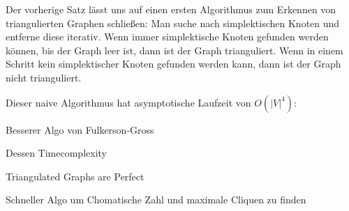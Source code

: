 \documentclass[../main.tex]{subfiles}
\begin{document}
Der vorherige Satz lässt uns auf einen ersten Algorithmus zum Erkennen von triangulierten Graphen schließen: Man suche nach simplektischen Knoten und entferne diese iterativ. Wenn immer simplektische Knoten gefunden werden können, bis der Graph leer ist, dann ist der Graph trianguliert. Wenn in einem Schritt kein simplektischer Knoten gefunden werden kann, dann ist der Graph nicht trianguliert.

Dieser naive Algorithmus hat asymptotische Laufzeit von $O(|V|^4)$: 


Besserer Algo von Fulkerson-Gross

Dessen Timecomplexity

Triangulated Graphs are Perfect

Schneller Algo um Chomatische Zahl und maximale Cliquen zu finden
\end{document}
